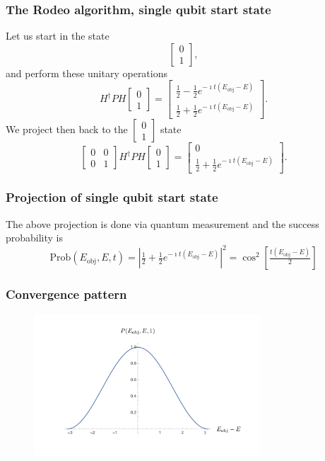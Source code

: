 \documentclass{beamer}
\begin{document}
\begin{frame}
\frametitle{The Rodeo algorithm, single qubit start state}
Let us start in the state
\[
\begin{bmatrix} 0 \\ 1\end{bmatrix},
\]
and perform these unitary operations 
\[
H^{\dagger}PH\begin{bmatrix} 0 \\ 1\end{bmatrix} =\begin{bmatrix} \tfrac{1}{2}-\tfrac{1}{2}e^{-\imath t(E_{\mathrm{obj}}-E)} \\ \tfrac{1}{2}+\tfrac{1}{2}e^{-\imath t(E_{\mathrm{obj}}-E)}\end{bmatrix}.
\]
We project then back to the $\begin{bmatrix} 0 \\ 1\end{bmatrix}$ state 
\[
\begin{bmatrix} 0 & 0 \\ 0 & 1\end{bmatrix}H^{\dagger}PH\begin{bmatrix} 0 \\ 1\end{bmatrix} =\begin{bmatrix} 0\\ \tfrac{1}{2}+\tfrac{1}{2}e^{-\imath t(E_{\mathrm{obj}}-E)}\end{bmatrix}.
\]

\end{frame}

\begin{frame}
\frametitle{Projection of single qubit start state}

The above  projection is done via quantum measurement and the success
probability is
\[
\mathrm{Prob}(E_{\mathrm{obj}},E,t)= \left\vert\tfrac{1}{2}+\tfrac{1}{2}e^{-\imath t(E_{\mathrm{obj}}-E)}\right\vert^2=\cos^2{\left[\tfrac{t(E_{\mathrm{obj}}-E)}{2}\right]}
\]


\end{frame}


\begin{frame}
\frametitle{Convergence pattern}

\begin{figure}
\centering
\includegraphics[width=8.5cm]{rodeofigs/rodeo2.png}
\end{figure} 

\end{frame}
\end{document}

